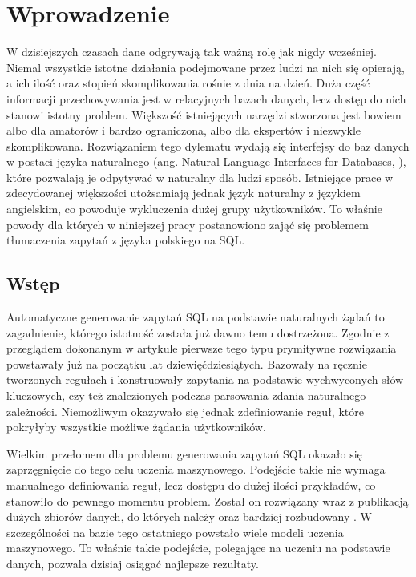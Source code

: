\chapter{Wprowadzenie}
W dzisiejszych czasach dane odgrywają tak ważną rolę jak nigdy wcześniej.  Niemal wszystkie istotne działania podejmowane przez ludzi na nich się opierają, a ich ilość oraz stopień skomplikowania rośnie z dnia na dzień. Duża część informacji przechowywania jest w relacyjnych bazach danych, lecz dostęp do nich stanowi istotny problem. Większość istniejących narzędzi stworzona jest bowiem albo dla amatorów i bardzo ograniczona, albo dla ekspertów i niezwykle skomplikowana. Rozwiązaniem tego dylematu wydają się interfejsy do baz danych w postaci języka naturalnego (ang. Natural Language Interfaces for Databases, ), które pozwalają je odpytywać w naturalny dla ludzi sposób. Istniejące prace w zdecydowanej większości utożsamiają jednak język naturalny z językiem angielskim, co powoduje wykluczenia dużej grupy użytkowników. To właśnie powody dla których w niniejszej pracy postanowiono zająć się problemem tłumaczenia zapytań z języka polskiego na SQL. 

\section{Wstęp}
Automatyczne generowanie zapytań SQL na podstawie naturalnych żądań to zagadnienie, którego istotność została już dawno temu dostrzeżona. Zgodnie z przeglądem dokonanym w artykule   pierwsze tego typu prymitywne rozwiązania powstawały już na początku lat dziewięćdziesiątych. Bazowały na ręcznie tworzonych regułach i konstruowały zapytania na podstawie wychwyconych słów kluczowych, czy też znalezionych podczas parsowania zdania naturalnego zależności. Niemożliwym okazywało się jednak zdefiniowanie reguł, które pokryłyby wszystkie możliwe żądania użytkowników.

Wielkim przełomem dla problemu generowania zapytań SQL okazało się zaprzęgnięcie do tego celu uczenia maszynowego. Podejście takie nie wymaga manualnego definiowania reguł, lecz dostępu do dużej ilości przykładów, co stanowiło do pewnego momentu problem. Został on rozwiązany wraz z publikacją dużych zbiorów danych, do których należy   oraz bardziej rozbudowany  . W szczególności na bazie tego ostatniego powstało wiele modeli uczenia maszynowego. To właśnie takie podejście, polegające na uczeniu na podstawie danych, pozwala dzisiaj osiągać najlepsze rezultaty.

